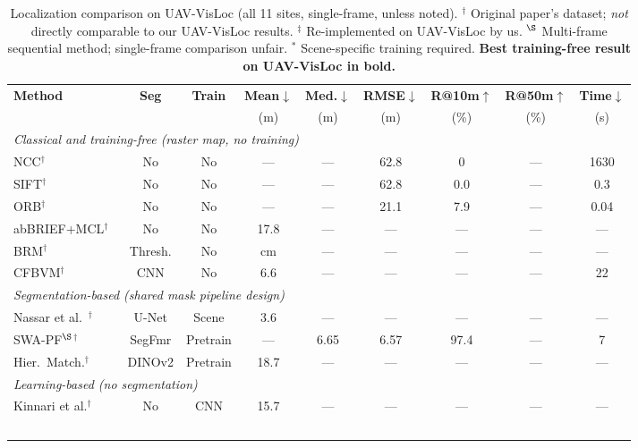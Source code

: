 \documentclass[10pt]{article}
\theoremstyle{plain}
\theoremstyle{definition}
\begin{document}
\begin{table}[htbp]
\caption{%
  Localization comparison on UAV-VisLoc (all 11 sites, single-frame, unless noted).
  $^\dagger$ Original paper's dataset; \emph{not} directly comparable to our UAV-VisLoc results.
  $^\ddagger$ Re-implemented on UAV-VisLoc by us.
  $^\S$ Multi-frame sequential method; single-frame comparison unfair.
  $^*$ Scene-specific training required.
  \textbf{Best training-free result on UAV-VisLoc in bold.}
}
\label{tab:main}
\centering\small
\setlength{\tabcolsep}{2pt}
\begin{tabular}{lcccccccc}
\toprule
\textbf{Method} & \textbf{Seg} & \textbf{Train} &
\textbf{Mean$\downarrow$} & \textbf{Med.$\downarrow$} & \textbf{RMSE$\downarrow$} &
\textbf{R@10m$\uparrow$} & \textbf{R@50m$\uparrow$} & \textbf{Time$\downarrow$} \\
 & & & (m) & (m) & (m) & (\%) & (\%) & (s) \\
\midrule
\multicolumn{9}{l}{\textit{Classical and training-free (raster map, no training)}} \\
NCC$^\dagger$
  & No & No & --- & --- & 62.8 & 0 & --- & 1630 \\
SIFT$^\dagger$~\cite{lowe2004sift}
  & No & No & --- & --- & 62.8 & 0.0 & --- & 0.3 \\
ORB$^\dagger$~\cite{rublee2011orb}
  & No & No & --- & --- & 21.1 & 7.9 & --- & 0.04 \\
abBRIEF+MCL$^\dagger$~\cite{mantelli2019abbrief}
  & No & No & 17.8 & --- & --- & --- & --- & --- \\
BRM$^\dagger$~\cite{choi2020brm}
  & Thresh. & No & cm & --- & --- & --- & --- & --- \\
CFBVM$^\dagger$~\cite{ouyang2024cfbvm}
  & CNN & No & 6.6 & --- & --- & --- & --- & 22 \\
\midrule
\multicolumn{9}{l}{\textit{Segmentation-based (shared mask pipeline design)}} \\
Nassar et al.~\cite{nassar2018deep}$^\dagger$
  & U-Net & Scene & 3.6 & --- & --- & --- & --- & --- \\
SWA-PF$^\S$$^\dagger$~\cite{yuan2025swapf}
  & SegFmr & Pretrain & --- & 6.65 & 6.57 & 97.4 & --- & 7 \\
Hier.\ Match.$^\dagger$~\cite{hieruav2025}
  & DINOv2 & Pretrain & 18.7 & --- & --- & --- & --- & --- \\
\midrule
\multicolumn{9}{l}{\textit{Learning-based (no segmentation)}} \\
Kinnari et al.$^\dagger$~\cite{kinnari2022season}
  & No & CNN & 15.7 & --- & --- & --- & --- & --- \\
$$
\end{tabular}
\end{table}
\end{document}

